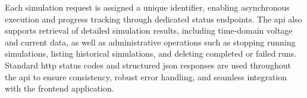 Each simulation request is assigned a unique identifier, enabling asynchronous execution and progress tracking through dedicated status endpoints. The \gls{api} also supports retrieval of detailed simulation results, including time-domain voltage and current data, as well as administrative operations such as stopping running simulations, listing historical simulations, and deleting completed or failed runs. Standard \gls{http} status codes and structured \gls{json} responses are used throughout the \gls{api} to ensure consistency, robust error handling, and seamless integration with the frontend application.



